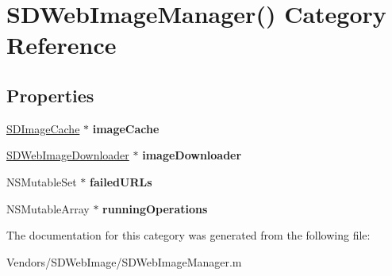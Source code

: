 \hypertarget{category_s_d_web_image_manager_07_08}{}\section{S\+D\+Web\+Image\+Manager() Category Reference}
\label{category_s_d_web_image_manager_07_08}
\subsection*{Properties}
\begin{DoxyCompactItemize}
\item 
\hypertarget{category_s_d_web_image_manager_07_08_a00dd37e2aa39558f2a5c16b2b655c729}{}\hyperlink{interface_s_d_image_cache}{S\+D\+Image\+Cache} $\ast$ {\bfseries image\+Cache}\label{category_s_d_web_image_manager_07_08_a00dd37e2aa39558f2a5c16b2b655c729}

\item 
\hypertarget{category_s_d_web_image_manager_07_08_a7e66111dcc164b2423b991ca52a3a503}{}\hyperlink{interface_s_d_web_image_downloader}{S\+D\+Web\+Image\+Downloader} $\ast$ {\bfseries image\+Downloader}\label{category_s_d_web_image_manager_07_08_a7e66111dcc164b2423b991ca52a3a503}

\item 
\hypertarget{category_s_d_web_image_manager_07_08_a01f02dad32e74342ebde6f9213015c92}{}N\+S\+Mutable\+Set $\ast$ {\bfseries failed\+U\+R\+Ls}\label{category_s_d_web_image_manager_07_08_a01f02dad32e74342ebde6f9213015c92}

\item 
\hypertarget{category_s_d_web_image_manager_07_08_a7e08e6a2e0f0f1a0ec8ecff9bcd66f3a}{}N\+S\+Mutable\+Array $\ast$ {\bfseries running\+Operations}\label{category_s_d_web_image_manager_07_08_a7e08e6a2e0f0f1a0ec8ecff9bcd66f3a}

\end{DoxyCompactItemize}


The documentation for this category was generated from the following file\+:\begin{DoxyCompactItemize}
\item 
Vendors/\+S\+D\+Web\+Image/S\+D\+Web\+Image\+Manager.\+m\end{DoxyCompactItemize}
